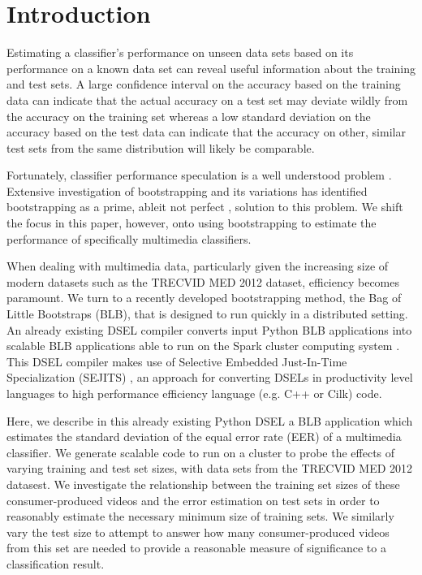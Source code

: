 \section{Introduction}

Estimating a classifier's performance on unseen data sets based on its performance on a known data set can reveal useful information about the training and test sets. A large confidence interval on the accuracy based on the training data can indicate that the actual accuracy on a test set may deviate wildly from the accuracy on the training set whereas a low standard deviation on the accuracy based on the test data can indicate that the accuracy on other, similar test sets from the same distribution will likely be comparable. 

Fortunately, classifier performance speculation is a well understood problem \cite{fukunaga1989estimation}. 
Extensive investigation of bootstrapping and its variations \cite{efron1979bootstrap,jain1987bootstrap, chernick1985application, sahiner2008classifier} has identified bootstrapping as a prime, ableit not perfect \cite{isaksson2008cross},
solution to this problem. We shift the focus in this paper, however, onto using bootstrapping to estimate the performance of specifically multimedia classifiers. 

When dealing with multimedia data, particularly given the increasing size of modern datasets such as the TRECVID MED 2012 dataset, efficiency becomes paramount. 
We turn to a recently developed bootstrapping method, the Bag of Little Bootstraps (BLB)\cite{kleiner2012big,kleiner2011scalable}, that is designed to run quickly in a distributed setting.
An already existing DSEL compiler converts input Python BLB applications into scalable BLB applications able to run on the Spark cluster computing system \cite{pbirsinger2013}. 
This DSEL compiler makes use of Selective Embedded Just-In-Time Specialization (SEJITS) \cite{Kamil:EECS-2013-1}, an approach for converting DSELs in productivity level languages to high performance efficiency language (e.g. C++ or Cilk) code. 

Here, we describe in this already existing Python DSEL a BLB application which estimates the standard deviation of the equal error rate (EER) of a multimedia classifier. We generate scalable code to run on a cluster to probe the effects of varying training and test set sizes, with data sets from the TRECVID MED 2012 datasest. We investigate the relationship between the training set sizes of these consumer-produced videos and the error estimation on test sets in order to reasonably estimate the necessary minimum size of training sets. We similarly vary the test size to attempt to answer how many consumer-produced videos from this set are needed to provide a reasonable measure of significance to a classification result. 

